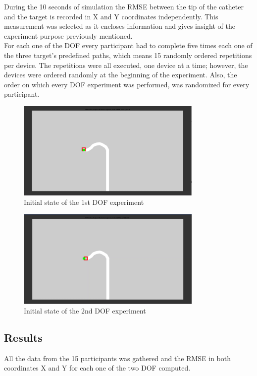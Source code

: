 During the 10 seconds of simulation the RMSE between the tip of the catheter and the target is recorded in X and Y coordinates independently. This measurement was selected as it encloses information and gives insight of the experiment purpose previously mentioned.\\

For each one of the DOF every participant had to complete five times each one of the three target's predefined paths, which means 15 randomly ordered repetitions per device. The repetitions were all executed, one device at a time; however, the devices were ordered randomly at the beginning of the experiment. Also, the order on which every DOF experiment was performed, was randomized for every participant.\\

\begin{figure}[ht]
   \centering
   \includegraphics[width=0.8\textwidth]{img/1stexp.PNG}
   \caption{Initial state of the 1st DOF experiment}
   \label{img:1stexp}
\end{figure}

\begin{figure}[ht]
   \centering
   \includegraphics[width=0.8\textwidth]{img/2ndexp.PNG}
   \caption{Initial state of the 2nd DOF experiment}
   \label{img:2ndexp}
\end{figure}

\subsection{Results}\label{subsec:1stres}
All the data from the 15 participants was gathered and the RMSE in both coordinates X and Y for each one of the two DOF computed.\\


